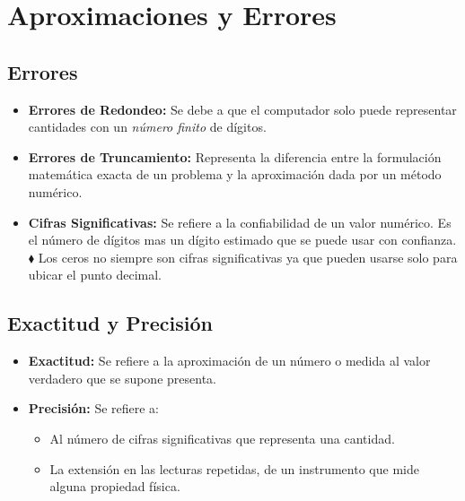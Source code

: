 \chapter{Aproximaciones y Errores}
\section{Errores}
\begin{itemize}
\item \textbf{Errores de Redondeo:} Se debe a que el computador solo puede representar cantidades con un \textit{número finito }de dígitos.
\item \textbf{Errores de Truncamiento:} Representa la diferencia entre la formulación  matemática exacta de un problema y la aproximación dada por un método numérico.
\item \textbf{Cifras Significativas:} Se refiere a la confiabilidad de un valor numérico. Es el número de dígitos mas un dígito estimado que se puede usar con confianza.\\${ }$\\
$\blacklozenge$ Los ceros no siempre son cifras significativas ya que pueden usarse solo para ubicar el punto decimal. 
\end{itemize}
\section{Exactitud y Precisión}
\begin{itemize}
\item \textbf{Exactitud:} Se refiere a la aproximación de un número o medida al valor verdadero que se supone presenta.
\item \textbf{Precisión:} Se refiere a:
\begin{itemize}
\item Al número de cifras significativas que representa una cantidad.
\item La extensión en las lecturas repetidas, de un instrumento que mide alguna propiedad física.
\end{itemize}
\end{itemize}